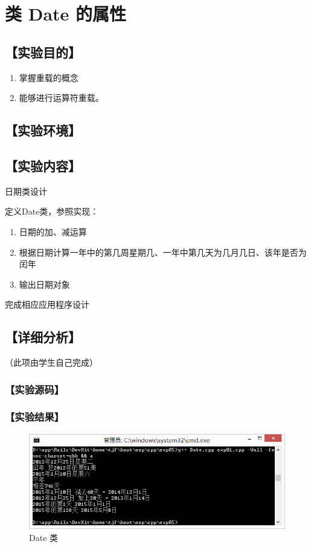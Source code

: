 \section{类 Date 的属性}
\hfill{}
\subsection*{【实验目的】}
\begin{enumerate}[topsep=0pt,partopsep=0pt,itemsep=0pt,parsep=0pt,label={\arabic*、}]
\item 掌握重载的概念
\item 能够进行运算符重载。
\end{enumerate}
\subsection*{【实验环境】}
\MyEnvironment
\subsection*{【实验内容】}
日期类设计

定义Date类，参照实现：
\begin{enumerate}[topsep=0pt,partopsep=0pt,itemsep=0pt,parsep=0pt,label={(\arabic*)}]
\item 日期的加、减运算
\item 根据日期计算一年中的第几周星期几、一年中第几天为几月几日、该年是否为闰年
\item 输出日期对象
\end{enumerate}

完成相应应用程序设计
\subsection*{【详细分析】}
（此项由学生自己完成）
\subsubsection*{【实验源码】}
{\linespread{1}}
{\linespread{1}}
{\linespread{1}}
\subsubsection*{【实验结果】}
\begin{figure}[htp]
\centering
\includegraphics[width=\textwidth]{exp05/exp01.png}
\caption{\label{out05_01}Date 类}
\end{figure}
